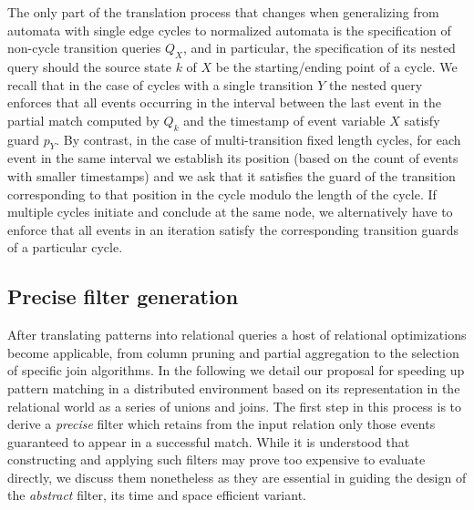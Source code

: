 The only part of the translation process that changes when generalizing from 
automata with single edge cycles to normalized automata is the specification of 
non-cycle transition queries $Q_X$, and in particular, the specification of its 
nested query should the source state $k$ of $X$ be the starting/ending point of 
a cycle.
We recall that in the case of cycles with a single transition $Y$ the nested 
query enforces that all events occurring in the interval between the last event 
in the partial match computed by $Q_k$ and the timestamp of event variable $X$ 
satisfy guard $p_Y$. 
By contrast, in the case of multi-transition fixed length cycles, for each 
event in the same interval we establish its position (based on  the count of 
events with smaller timestamps) and we ask that it satisfies the guard of the 
transition corresponding to that position in the cycle modulo the length of the 
cycle.
If multiple cycles initiate and conclude at the same node, we alternatively 
have to enforce that all events in an iteration satisfy the corresponding 
transition guards of a particular cycle.


\subsection{Precise filter generation}
\label{sec:prec_filter_generation}



After translating patterns into relational queries a host of relational 
optimizations become applicable, from column pruning and partial aggregation to
the selection of specific join algorithms.
In the following we detail our proposal for speeding up pattern matching in a 
distributed environment based on its representation in the relational world as 
a series of unions and joins.
The first step in this process is to derive a {\em precise} filter which 
retains from the input relation only those events guaranteed to appear in a 
successful match.
While it is understood that constructing and applying such filters may prove 
too expensive to evaluate directly, we discuss them nonetheless as they are 
essential in guiding the design of the {\em abstract} filter, its time and 
space efficient variant. 



 
